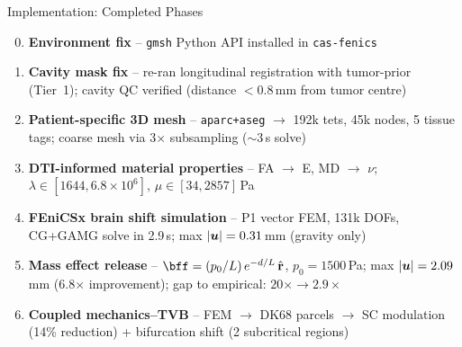 \begin{frame}{Implementation: Completed Phases}

  \small

  \begin{enumerate}
    \setcounter{enumi}{-1}
    \item[\checkmark] \textbf{Environment fix} -- \texttt{gmsh} Python API
      installed in \texttt{cas-fenics}

    \item[\checkmark] \textbf{Cavity mask fix} -- re-ran longitudinal
      registration with tumor-prior (Tier~1); cavity QC verified
      (distance $< 0.8$\,mm from tumor centre)

    \item[\checkmark] \textbf{Patient-specific 3D mesh} --
      \texttt{aparc+aseg} $\to$ 192k tets, 45k nodes, 5 tissue tags;
      coarse mesh via 3$\times$ subsampling ($\sim$3\,s solve)

    \item[\checkmark] \textbf{DTI-informed material properties} --
      FA $\to$ E, MD $\to$ $\nu$; $\lambda \in [1644, 6.8\!\times\!10^6]$,
      $\mu \in [34, 2857]$\,Pa

    \item[\checkmark] \textbf{FEniCSx brain shift simulation} --
      P1 vector FEM, 131k DOFs, CG+GAMG solve in \alert{2.9\,s};
      max $|\bm{u}| = 0.31$\,mm (gravity only)

    \item[\checkmark] \textbf{Mass effect release} --
      $\bff = (p_0/L)\,e^{-d/L}\,\hat{\mathbf{r}}$,
      $p_0 = 1500$\,Pa; max $|\bm{u}| = 2.09$\,mm (\alert{6.8$\times$ improvement});
      gap to empirical: $20\times \to 2.9\times$

    \item[\checkmark] \textbf{Coupled mechanics--TVB} --
      FEM $\to$ DK68 parcels $\to$ SC modulation (14\% reduction)
      + bifurcation shift (2 subcritical regions)
  \end{enumerate}

\end{frame}


